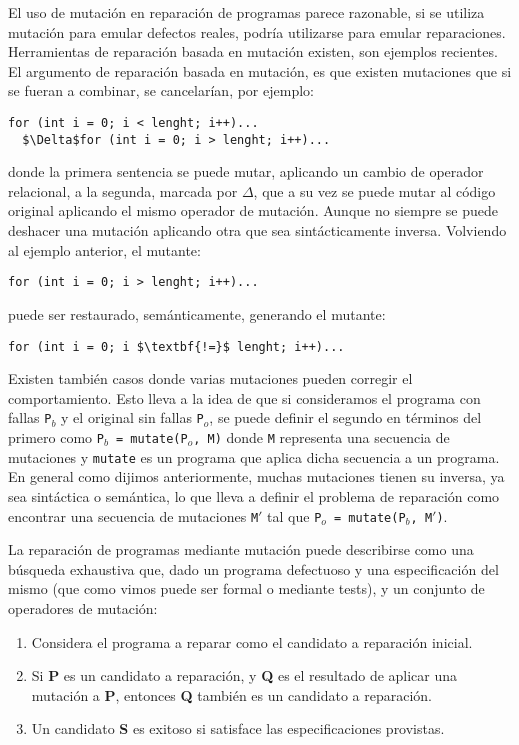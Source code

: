 El uso de mutaci\'on en reparaci\'on de programas parece razonable, si se utiliza mutaci\'on para emular defectos reales, podr\'ia utilizarse para emular reparaciones. Herramientas de reparaci\'on basada en mutaci\'on existen, \cite{bibliography.repair.mutation.DebroyW10, bibliography.repair.mutation.AlloyWang18} son ejemplos recientes. El argumento de reparaci\'on basada en mutaci\'on, es que existen mutaciones que si se fueran a combinar, se cancelar\'ian, por ejemplo:
\begin{lstlisting}[mathescape=true]
  for (int i = 0; i < lenght; i++)...
  $\Delta$for (int i = 0; i > lenght; i++)...
\end{lstlisting}
donde la primera sentencia se puede mutar, aplicando un cambio de operador relacional, a la segunda, marcada por $\Delta$, que a su vez se puede mutar al c\'odigo original aplicando el mismo operador de mutaci\'on. Aunque no siempre se puede deshacer una mutaci\'on aplicando otra que sea sint\'acticamente inversa. 
Volviendo al ejemplo anterior, el mutante:
\begin{lstlisting}[mathescape=true]
  for (int i = 0; i > lenght; i++)...
\end{lstlisting}
puede ser restaurado, sem\'anticamente, generando el mutante:
\begin{lstlisting}[mathescape=true]
  for (int i = 0; i $\textbf{!=}$ lenght; i++)...
\end{lstlisting}
Existen tambi\'en casos donde varias mutaciones pueden corregir el comportamiento. Esto lleva a la idea de que si consideramos el programa con fallas \texttt{P$_b$} y el original sin fallas \texttt{P$_o$}, se puede definir el segundo en t\'erminos del primero como \texttt{P$_b$ = mutate(P$_o$, M)} donde \texttt{M} representa una secuencia de mutaciones y \texttt{mutate} es un programa que aplica dicha secuencia a un programa. En general como dijimos anteriormente, muchas mutaciones tienen su inversa, ya sea sint\'actica o sem\'antica, lo que lleva a definir el problema de reparaci\'on como encontrar una secuencia de mutaciones \texttt{M$\prime$} tal que \texttt{P$_o$ = mutate(P$_b$, M$\prime$)}.

La reparaci\'on de programas mediante mutaci\'on puede describirse como una b\'usqueda exhaustiva que, dado un programa defectuoso y una especificaci\'on del mismo (que como vimos puede ser formal o mediante tests), y un conjunto de operadores de mutaci\'on:
\begin{enumerate}
	\item Considera el programa a reparar como el candidato a reparaci\'on inicial.
	
	\item Si \textbf{P} es un candidato a reparaci\'on, y \textbf{Q} es el resultado de aplicar una mutaci\'on a \textbf{P}, entonces \textbf{Q} tambi\'en es un candidato a reparaci\'on.
	
	\item  Un candidato \textbf{S} es exitoso si satisface las especificaciones provistas.
\end{enumerate}

